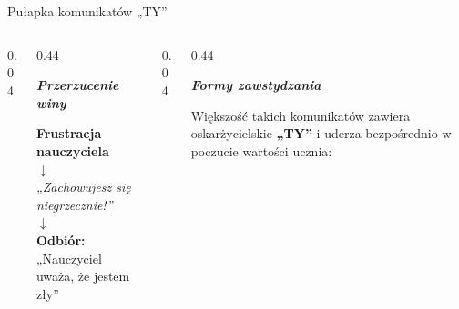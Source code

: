 \documentclass[10pt, aspectratio=169]{beamer}
\begin{document}
\begin{frame}{Pułapka komunikatów „TY”}
    \vspace{0.05cm}
    \begin{columns}[T]
        \begin{column}{0.04\textwidth}\end{column}
        \pause
        
        \begin{column}{0.44\textwidth}
            \begin{center}
                {\Large\rmfamily\itshape\bfseries\textcolor{accentCoral}{Przerzucenie winy}}\\[0.1cm]
                
            \end{center}
            \begin{center}
                \footnotesize
                \textcolor{primaryNavy}{\textbf{Frustracja nauczyciela}} \\
                \vspace{0.1cm}
                \textcolor{textMuted}{$\downarrow$} \\
                \vspace{0.1cm}
                \textcolor{accentCoral}{\textit{„Zachowujesz się niegrzecznie!”}} \\
                \vspace{0.1cm}
                \textcolor{textMuted}{$\downarrow$} \\
                \vspace{0.1cm}
                \textcolor{textPrimary}{\textbf{Odbiór:} „Nauczyciel uważa, że jestem zły”}
            \end{center}
        \end{column}
        
        \begin{column}{0.04\textwidth}\end{column}
        \pause
        
        \begin{column}{0.44\textwidth}
            \begin{center}
                {\Large\rmfamily\itshape\bfseries\textcolor{primaryNavy}{Formy zawstydzania}}\\
            \end{center}
            \vspace{0.2cm}
            
            \small\textcolor{textPrimary}{
            Większość takich komunikatów zawiera oskarżycielskie \textbf{„TY”} i uderza bezpośrednio w poczucie wartości ucznia:
            }
            

\end{column}
\end{columns}
\end{frame}
\end{document}
